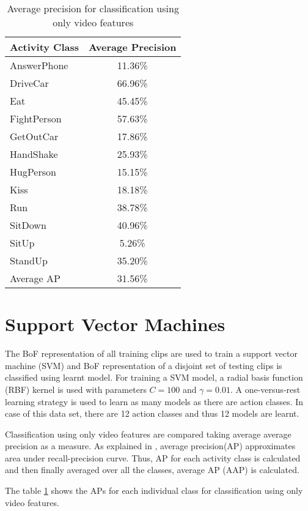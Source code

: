 \begin{table}[t]
\centering
\begin{tabular}{| l | c |}
\hline
{\bf Activity Class} & {\bf Average Precision} \\ \hline
%
AnswerPhone & 11.36\% \\ \hline
DriveCar & 66.96\% \\ \hline
Eat & 45.45\% \\ \hline
FightPerson & 57.63\% \\ \hline
GetOutCar & 17.86\% \\ \hline
HandShake & 25.93\% \\ \hline
HugPerson & 15.15\% \\ \hline
Kiss & 18.18\% \\ \hline
Run & 38.78\% \\ \hline
SitDown & 40.96\% \\ \hline
SitUp & 5.26\% \\ \hline
StandUp & 35.20\% \\ \hline
Average AP & 31.56\% \\ \hline
%
\end{tabular}
\caption{Average precision for classification using only video features}
\label{table:AP_OnlyAction}
\end{table}


\section{Support Vector Machines}
\label{AP_definition}
The BoF representation of all training clips are used to train a
support vector machine (SVM) and BoF representation of a disjoint set of testing clips is classified using
learnt model. For training a SVM model, a radial basis function (RBF) kernel is used with parameters $C = 100$ 
and $\gamma = 0.01$. A one-versus-rest learning strategy is used to learn as many models as there are action classes.
In case of this data set, there are 12 action classes and thus 12 models are learnt.

Classification using only video features are compared taking  average average precision as a measure.
As explained in \cite{actionsInContext}, average precision(AP) approximates area under recall-precision curve.
Thus, AP for each activity class is calculated and then finally averaged over all the classes, average AP (AAP) is calculated.

The table \ref{table:AP_OnlyAction} shows the APs for each individual class for classification using only video features.

